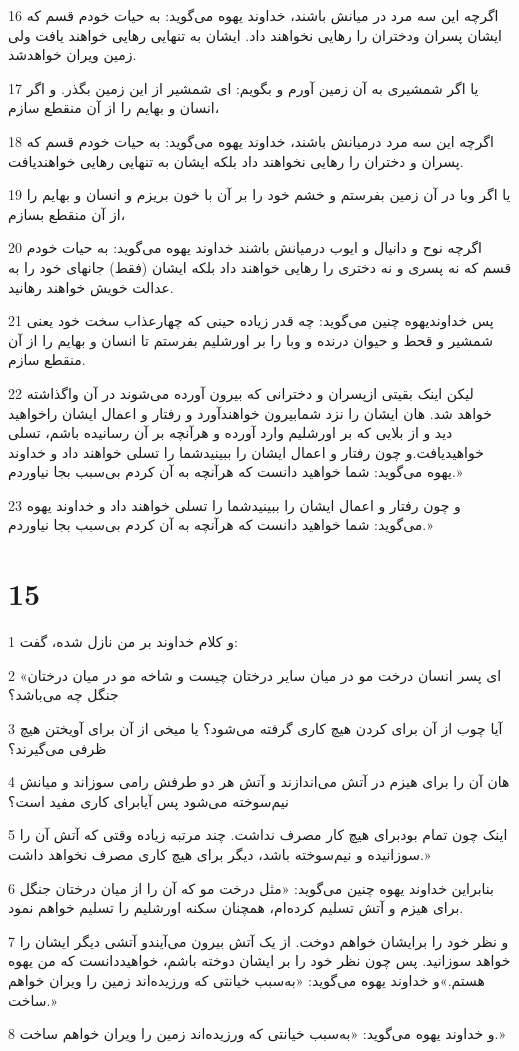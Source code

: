 \par 16 اگرچه این سه مرد در میانش باشند، خداوند یهوه می‌گوید: به حیات خودم قسم که ایشان پسران ودختران را رهایی نخواهند داد. ایشان به تنهایی رهایی خواهند یافت ولی زمین ویران خواهدشد.
\par 17 یا اگر شمشیری به آن زمین آورم و بگویم: ای شمشیر از این زمین بگذر. و اگر انسان و بهایم را از آن منقطع سازم،
\par 18 اگر‌چه این سه مرد درمیانش باشند، خداوند یهوه می‌گوید: به حیات خودم قسم که پسران و دختران را رهایی نخواهند داد بلکه ایشان به تنهایی رهایی خواهندیافت.
\par 19 یا اگر وبا در آن زمین بفرستم و خشم خود را بر آن با خون بریزم و انسان و بهایم را از آن منقطع بسازم،
\par 20 اگر‌چه نوح و دانیال و ایوب درمیانش باشند خداوند یهوه می‌گوید: به حیات خودم قسم که نه پسری و نه دختری را رهایی خواهند داد بلکه ایشان (فقط) جانهای خود را به عدالت خویش خواهند رهانید.
\par 21 پس خداوندیهوه چنین می‌گوید: چه قدر زیاده حینی که چهارعذاب سخت خود یعنی شمشیر و قحط و حیوان درنده و وبا را بر اورشلیم بفرستم تا انسان و بهایم را از آن منقطع سازم.
\par 22 لیکن اینک بقیتی ازپسران و دخترانی که بیرون آورده می‌شوند در آن واگذاشته خواهد شد. هان ایشان را نزد شمابیرون خواهند‌آورد و رفتار و اعمال ایشان راخواهید دید و از بلایی که بر اورشلیم وارد آورده و هر‌آنچه بر آن رسانیده باشم، تسلی خواهیدیافت.و چون رفتار و اعمال ایشان را ببینیدشما را تسلی خواهند داد و خداوند یهوه می‌گوید: شما خواهید دانست که هر‌آنچه به آن کردم بی‌سبب بجا نیاوردم.»
\par 23 و چون رفتار و اعمال ایشان را ببینیدشما را تسلی خواهند داد و خداوند یهوه می‌گوید: شما خواهید دانست که هر‌آنچه به آن کردم بی‌سبب بجا نیاوردم.»

\chapter{15}

\par 1 و کلام خداوند بر من نازل شده، گفت:
\par 2 «ای پسر انسان درخت مو در میان سایر درختان چیست و شاخه مو در میان درختان جنگل چه می‌باشد؟
\par 3 آیا چوب از آن برای کردن هیچ کاری گرفته می‌شود؟ یا میخی از آن برای آویختن هیچ ظرفی می‌گیرند؟
\par 4 هان آن را برای هیزم در آتش می‌اندازند و آتش هر دو طرفش رامی سوزاند و میانش نیم‌سوخته می‌شود پس آیابرای کاری مفید است؟
\par 5 اینک چون تمام بودبرای هیچ کار مصرف نداشت. چند مرتبه زیاده وقتی که آتش آن را سوزانیده و نیم‌سوخته باشد، دیگر برای هیچ کاری مصرف نخواهد داشت.»
\par 6 بنابراین خداوند یهوه چنین می‌گوید: «مثل درخت مو که آن را از میان درختان جنگل برای هیزم و آتش تسلیم کرده‌ام، همچنان سکنه اورشلیم را تسلیم خواهم نمود.
\par 7 و نظر خود را برایشان خواهم دوخت. از یک آتش بیرون می‌آیندو آتشی دیگر ایشان را خواهد سوزانید. پس چون نظر خود را بر ایشان دوخته باشم، خواهیددانست که من یهوه هستم.»و خداوند یهوه می‌گوید: «به‌سبب خیانتی که ورزیده‌اند زمین را ویران خواهم ساخت.»
\par 8 و خداوند یهوه می‌گوید: «به‌سبب خیانتی که ورزیده‌اند زمین را ویران خواهم ساخت.»


